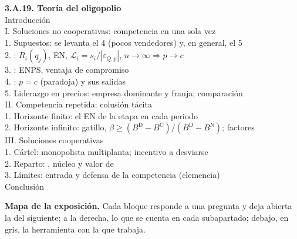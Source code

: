 \documentclass[11pt]{article}
\begin{document}
\begin{esquema}
\textbf{3.A.19. Teoría del oligopolio}\\[2pt]
Introducción\\
I. Soluciones no cooperativas: competencia en una sola vez\\
\hspace*{1.5em}1. Supuestos: se levanta el 4 (pocos vendedores) y, en general, el 5\\
\hspace*{1.5em}2. : $R_i(q_j)$, EN, $\mathcal{L}_i=s_i/|\varepsilon_{Q,p}|$, $n\to\infty\Rightarrow p\to c$\\
\hspace*{1.5em}3. : ENPS, ventaja de compromiso\\
\hspace*{1.5em}4. : $p=c$ (paradoja) y sus salidas\\
\hspace*{1.5em}5. Liderazgo en precios: empresa dominante y franja; comparación\\
II. Competencia repetida: colusión tácita\\
\hspace*{1.5em}1. Horizonte finito: el EN de la etapa en cada periodo\\
\hspace*{1.5em}2. Horizonte infinito: gatillo, $\beta\geq(B^{\mathrm D}-B^{\mathrm C})/(B^{\mathrm D}-B^{\mathrm N})$; factores\\
III. Soluciones cooperativas\\
\hspace*{1.5em}1. Cártel: monopolista multiplanta; incentivo a desviarse\\
\hspace*{1.5em}2. Reparto: , núcleo y valor de \\
\hspace*{1.5em}3. Límites: entrada y defensa de la competencia (clemencia)\\
Conclusión
\end{esquema}

\begin{anotaciones}
\textbf{Mapa de la exposición.} Cada bloque responde a una pregunta y deja abierta la del siguiente; a la derecha, lo que se cuenta en cada subapartado; debajo, en gris, la herramienta con la que trabaja.
\begin{infografiacaja}
\caption{Mapa del tema: la pregunta de cada bloque, sus subapartados y el hilo que los une}\label{figu:mapa-tema}
\end{infografiacaja}
\end{anotaciones}
\end{document}
